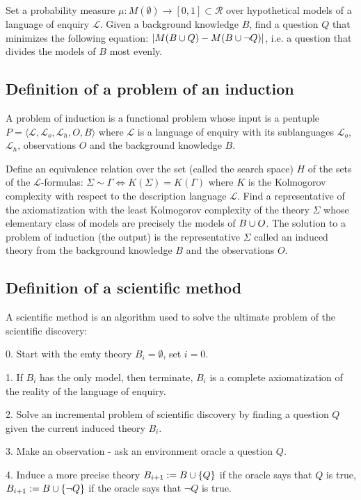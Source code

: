 Set a probability measure $\mu:M(\emptyset) \to [0,1] \subset \mathcal{R}$ over hypothetical models of a language of enquiry $\mathcal{L}$. Given a background knowledge $B$, find a question $Q$ that minimizes the following equation: $|M(B \cup {Q})-M(B \cup {\neg Q})|$, i.e. a question that divides the models of $B$ most evenly.

\subsection{Definition of a problem of an induction}
A problem of induction is a functional problem whose input is a pentuple $P=\langle\mathcal{L}, \mathcal{L}_o, \mathcal{L}_h, O, B\rangle$ where $\mathcal{L}$ is a language of enquiry with its sublanguages $\mathcal{L}_o$, $\mathcal{L}_h$, observations $O$ and the background knowledge $B$.

Define an equivalence relation over the set (called the search space) $H$ of the sets of the $\mathcal{L}$-formulas: $\Sigma \sim \Gamma \iff K(\Sigma)=K(\Gamma)$ where $K$ is the Kolmogorov complexity with respect to the description language $\mathcal{L}$. Find a representative of the axiomatization with the least Kolmogorov complexity of the theory $\Sigma$ whose elementary class of models are precisely the models of $B \cup O$. The solution  to a problem of induction (the output) is the representative $\Sigma$ called an induced theory from the background knowledge $B$ and the observations $O$.

\subsection{Definition of a scientific method}
A scientific method is an algorithm used to solve the ultimate problem of the scientific discovery:

0. Start with the emty theory $B_i=\emptyset$, set $i=0$.

1. If $B_i$ has the only model, then terminate, $B_i$ is a complete axiomatization of the reality of the language of enquiry.

2. Solve an incremental problem of scientific discovery by finding a question $Q$ given the current induced theory $B_i$.

3. Make an observation - ask an environment oracle a question $Q$.

4. Induce a more precise theory $B_{i+1}:=B \cup \{Q\}$ if the oracle says that $Q$ is true, $B_{i+1}:=B \cup \{\neg Q\}$ if the oracle says that $\neg Q$ is true.

